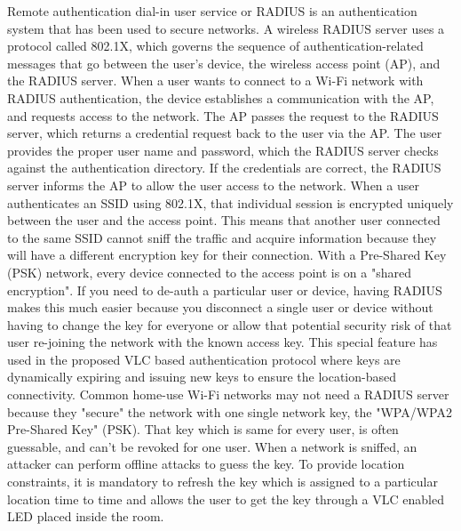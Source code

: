 Remote authentication dial-in user service or RADIUS is an authentication system that has been used to secure networks. A wireless RADIUS server uses a protocol called 802.1X, which governs the sequence of authentication-related messages that go between the user’s device, the wireless access point (AP), and the RADIUS server. When a user wants to connect to a Wi-Fi network with RADIUS authentication, the device establishes a communication with the AP, and requests access to the network. The AP passes the request to the RADIUS server, which returns a credential request back to the user via the AP. The user provides the proper user name and password, which the RADIUS server checks against the authentication directory. If the credentials are correct, the RADIUS server informs the AP to allow the user access to the network. 
When a user authenticates an SSID using 802.1X, that individual session is encrypted uniquely between the user and the access point. This means that another user connected to the same SSID cannot sniff the traffic and acquire information because they will have a different encryption key for their connection. With a Pre-Shared Key (PSK) network, every device connected to the access point is on a "shared encryption". If you need to de-auth a particular user or device, having RADIUS makes this much easier because you disconnect a single user or device without having to change the key for everyone or allow that potential security risk of that user re-joining the network with the known access key. This special feature has used in the proposed VLC based authentication protocol where keys are dynamically expiring and issuing new keys to ensure the location-based connectivity.
Common home-use Wi-Fi networks may not need a RADIUS server because they "secure" the network with one single network key, the "WPA/WPA2 Pre-Shared Key" (PSK). That key which is same for every user, is often guessable, and can't be revoked for one user.  When a network is sniffed, an attacker can perform offline attacks to guess the key. To provide location constraints, it is mandatory to refresh the key which is assigned to a particular location time to time and allows the user to get the key through a VLC enabled LED placed inside the room.
